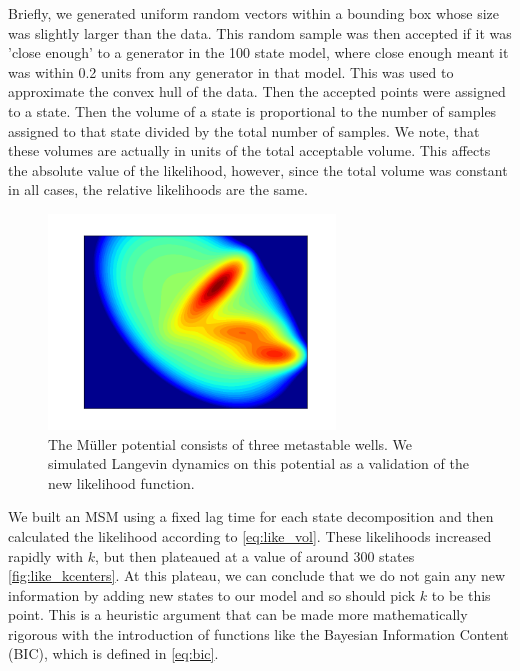 \documentclass[twocolumn,floatfix,nofootinbib,aps]{revtex4-1}
\begin{document}
Briefly, we generated uniform random vectors within a bounding box whose size was slightly larger than the data. This random sample was then accepted if it was 'close enough' to a generator in the 100 state model, where close enough meant it was within 0.2 units from any generator in that model. This was used to approximate the convex hull of the data. Then the accepted points were assigned to a state. Then the volume of a state is proportional to the number of samples assigned to that state divided by the total number of samples. We note, that these volumes are actually in units of the total acceptable volume. This affects the absolute value of the likelihood, however, since the total volume was constant in all cases, the relative likelihoods are the same.
\begin{figure}[h!]
\includegraphics[width=3in]{figs/muller_pot.png}
\caption{The M\"{u}ller potential consists of three metastable wells. We simulated Langevin dynamics on this potential as a validation of the new likelihood function.}
\label{fig:muller_pot}
\end{figure} 

We built an MSM using a fixed lag time for each state decomposition and then calculated the likelihood according to \cref{eq:like_vol}. These likelihoods increased rapidly with $k$, but then plateaued at a value of around 300 states \cref{fig:like_kcenters}. At this plateau, we can conclude that we do not gain any new information by adding new states to our model and so should pick $k$ to be this point. This is a heuristic argument that can be made more mathematically rigorous with the introduction of functions like the Bayesian Information Content (BIC), which is defined in \cref{eq:bic}.
\end{document}
